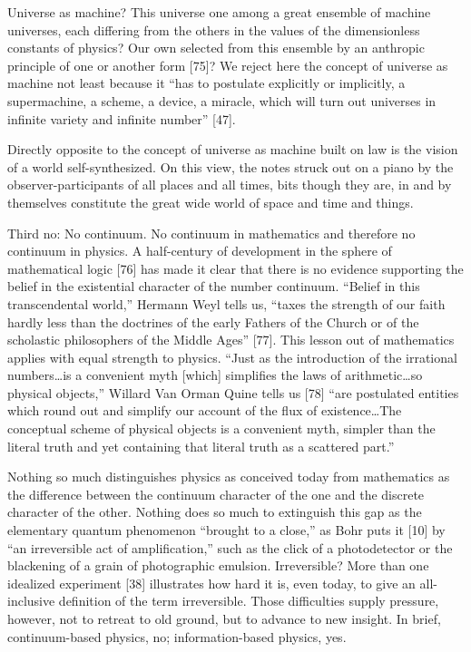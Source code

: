\documentclass[11pt]{article}
\begin{document}
	Universe as machine? This universe one among a great ensemble of machine
	universes, each differing from the others in the values of the dimensionless constants
	of physics? Our own selected from this ensemble by an anthropic principle of one
	or another form [75]? We reject here the concept of universe as machine not least
	because it ``has to postulate explicitly or implicitly, a supermachine, a scheme,
	a device, a miracle, which will turn out universes in infinite variety and infinite
	number'' [47].
	
	Directly opposite to the concept of universe as machine built on law is the vision
	of a world self-synthesized. On this view, the notes struck out on a piano by the
	observer-participants of all places and all times, bits though they are, in and by
	themselves constitute the great wide world of space and time and things.
	
	Third no: No continuum. No continuum in mathematics and therefore no continuum in physics. A half-century of development in the sphere of mathematical
	logic [76] has made it clear that there is no evidence supporting the belief in the existential character of the number continuum. ``Belief in this transcendental world,''
	Hermann Weyl tells us, ``taxes the strength of our faith hardly less than the doctrines of the early Fathers of the Church or of the scholastic philosophers of
	the Middle Ages'' [77]. This lesson out of mathematics applies with equal strength
	to physics. ``Just as the introduction of the irrational numbers\ldots is a convenient
	myth [which] simplifies the laws of arithmetic\ldots so physical objects,'' Willard Van
	Orman Quine tells us [78] ``are postulated entities which round out and simplify
	our account of the flux of existence\ldots The conceptual scheme of physical objects
	is a convenient myth, simpler than the literal truth and yet containing that literal
	truth as a scattered part.''
	
	Nothing so much distinguishes physics as conceived today from mathematics as
	the difference between the continuum character of the one and the discrete character of the other. Nothing does so much to extinguish this gap as the elementary
	quantum phenomenon ``brought to a close,'' as Bohr puts it [10] by ``an irreversible
	act of amplification,'' such as the click of a photodetector or the blackening of
	a grain of photographic emulsion. Irreversible? More than one idealized experiment [38] illustrates how hard it is, even today, to give an all-inclusive definition of
	the term irreversible. Those difficulties supply pressure, however, not to retreat to
	old ground, but to advance to new insight. In brief, continuum-based physics, no;
	information-based physics, yes.
	
\end{document}

